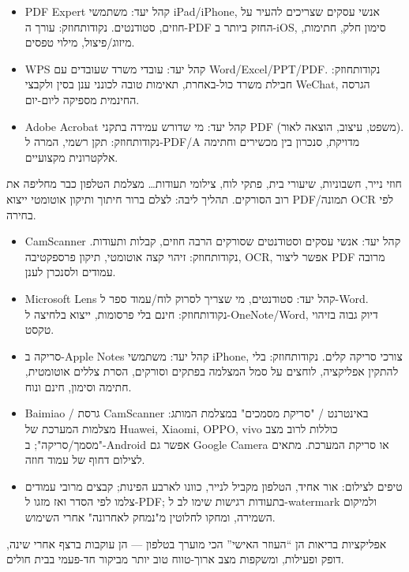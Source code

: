 
\begin{itemize}
  \item PDF Expert קהל יעד: משתמשי iPad/iPhone, אנשי עסקים שצריכים להעיר על חוזים, סטודנטים. נקודותחוזק: עורך ה-PDF החזק ביותר ב-iOS, סימון חלק, חתימות, מיזוג/פיצול, מילוי טפסים.
  \item WPS קהל יעד: עובדי משרד שעובדים עם Word/Excel/PPT/PDF. נקודותחוזק: חבילת משרד כול-באחרת, תאימות טובה לכונני ענן בסין ולקבצי WeChat, הגרסה החינמית מספיקה ליום-יום.
  \item Adobe Acrobat קהל יעד: מי שדורש עמידה בתקני PDF (משפט, עיצוב, הוצאה לאור). נקודותחוזק: תקן רשמי, המרה ל-PDF/A מדויקת, סנכרון בין מכשירים וחתימה אלקטרונית מקצועיים.
\end{itemize}


חוזי נייר, חשבוניות, שיעורי בית, פתקי לוח, צילומי תעודות… מצלמת הטלפון כבר מחליפה את רוב הסורקים. תהליך ליבה: לצלם ברור חיתוך ותיקון אוטומטי ייצוא PDF/תמונה OCR לפי בחירה.

\begin{itemize}
  \item CamScanner קהל יעד: אנשי עסקים וסטודנטים שסורקים הרבה חוזים, קבלות ותעודות. נקודותחוזק: זיהוי קצה אוטומטי, תיקון פרספקטיבה, OCR, אפשר ליצור PDF מרובה עמודים ולסנכרן לענן.
  \item Microsoft Lens קהל יעד: סטודנטים, מי שצריך לסרוק לוח/עמוד ספר ל-Word. נקודותחוזק: חינם בלי פרסומות, ייצוא בלחיצה ל-OneNote/Word, דיוק גבוה בזיהוי טקסט.
  \item סריקה ב-Apple Notes קהל יעד: משתמשי iPhone, צורכי סריקה קלים. נקודותחוזק: בלי להתקין אפליקציה, לוחצים על סמל המצלמה בפתקים וסורקים, הסרת צללים אוטומטית, חתימה וסימון, חינם ונוח.
  \item Baimiao / גרסת CamScanner באינטרנט / "סריקת מסמכים" במצלמת המותג: מצלמות המערכת של Huawei, Xiaomi, OPPO, vivo כוללות לרוב מצב "מסמך/סריקה"; ב-Android אפשר גם Google Camera או סריקת המערכת. מתאים לצילום דחוף של עמוד חוזה.
  \item טיפים לצילום: אור אחיד, הטלפון מקביל לנייר, כוונו לארבע הפינות; קבצים מרובי עמודים צלמו לפי הסדר ואז מזגו ל-PDF; בתעודות רגישות שימו לב ל-watermark ולמיקום השמירה, ומחקו לחלוטין מ"נמחק לאחרונה" אחרי השימוש.
\end{itemize}


אפליקציות בריאות הן “העוזר האישי” הכי מוערך בטלפון — הן עוקבות ברצף אחרי שינה, דופק ופעילות, ומשקפות מצב ארוך-טווח טוב יותר מביקור חד-פעמי בבית חולים.

